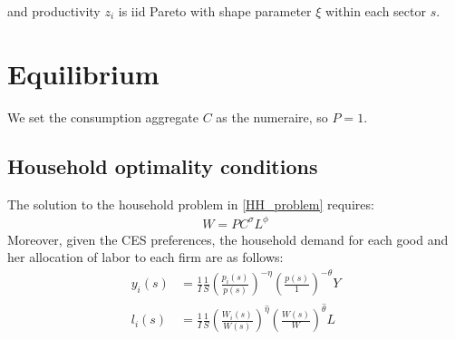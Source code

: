 \documentclass[12pt]{article}%
\begin{document}
and productivity $z_i$ is iid Pareto with shape parameter $\xi$ within each sector $s$. 



\section{Equilibrium}

We set the consumption aggregate $C$ as the numeraire, so $P = 1$.


\subsection{Household optimality conditions}
The solution to the household problem in \eqref{HH_problem} requires:
\begin{align}
    W = P C^\sigma L^\phi
\end{align}
Moreover, given the CES preferences, the household demand for each good and her allocation of labor to each firm are as follows:
\begin{align}
    y_i(s) &= \frac{1}{I} \frac{1}{S} \left( \frac{p_i(s)}{p(s)} \right)^{-\eta} \left( \frac{p(s)}{1} \right)^{-\theta} Y \label{direct_demand} \\
    l_i(s) &= \frac{1}{I} \frac{1}{S} \left( \frac{W_i(s)}{W(s)} \right)^{\hat{\eta}} \left( \frac{W(s)}{W} \right)^{\hat{\theta}} L \label{direct_laborSupply} 
\end{align}
\end{document}
